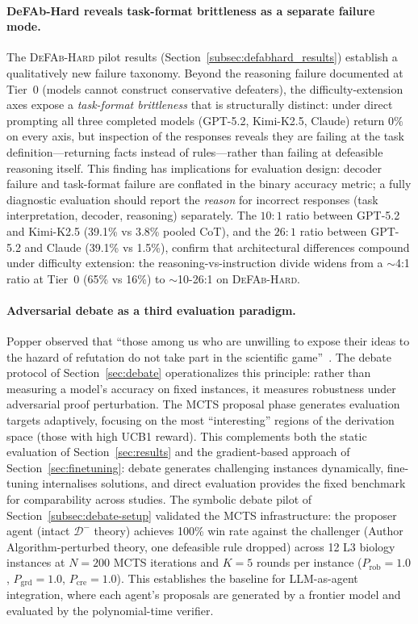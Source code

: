 \documentclass{article}
\theoremstyle{definition}
\newcommand{\Dm}{\mathcal{D}^{-}}
\begin{document}
\paragraph{DeFAb-Hard reveals task-format brittleness as a separate failure mode.} The \textsc{DeFAb-Hard} pilot results (Section~\ref{subsec:defabhard_results}) establish a qualitatively new failure taxonomy. Beyond the reasoning failure documented at Tier~0 (models cannot construct conservative defeaters), the difficulty-extension axes expose a \emph{task-format brittleness} that is structurally distinct: under direct prompting all three completed models (GPT-5.2, Kimi-K2.5, Claude) return $0\%$ on every axis, but inspection of the responses reveals they are failing at the task definition---returning facts instead of rules---rather than failing at defeasible reasoning itself. This finding has implications for evaluation design: decoder failure and task-format failure are conflated in the binary accuracy metric; a fully diagnostic evaluation should report the \emph{reason} for incorrect responses (task interpretation, decoder, reasoning) separately. The $10\colon 1$ ratio between GPT-5.2 and Kimi-K2.5 (39.1\% vs 3.8\% pooled CoT), and the $26\colon 1$ ratio between GPT-5.2 and Claude (39.1\% vs 1.5\%), confirm that architectural differences compound under difficulty extension: the reasoning-vs-instruction divide widens from a $\sim$4:1 ratio at Tier~0 (65\% vs 16\%) to $\sim$10-26:1 on \textsc{DeFAb-Hard}.

\paragraph{Adversarial debate as a third evaluation paradigm.} Popper observed that ``those among us who are unwilling to expose their ideas to the hazard of refutation do not take part in the scientific game''~\cite{popper1959logic}. The debate protocol of Section~\ref{sec:debate} operationalizes this principle: rather than measuring a model's accuracy on fixed instances, it measures robustness under adversarial proof perturbation. The MCTS proposal phase generates evaluation targets adaptively, focusing on the most ``interesting'' regions of the derivation space (those with high UCB1 reward). This complements both the static evaluation of Section~\ref{sec:results} and the gradient-based approach of Section~\ref{sec:finetuning}: debate generates challenging instances dynamically, fine-tuning internalises solutions, and direct evaluation provides the fixed benchmark for comparability across studies. The symbolic debate pilot of Section~\ref{subsec:debate-setup} validated the MCTS infrastructure: the proposer agent (intact $\Dm$ theory) achieves 100\% win rate against the challenger (Author Algorithm-perturbed theory, one defeasible rule dropped) across 12 L3 biology instances at $N=200$ MCTS iterations and $K=5$ rounds per instance ($P_{\mathrm{rob}} = 1.0$, $P_{\mathrm{grd}} = 1.0$, $P_{\mathrm{cre}} = 1.0$). This establishes the baseline for LLM-as-agent integration, where each agent's proposals are generated by a frontier model and evaluated by the polynomial-time verifier.
\end{document}
